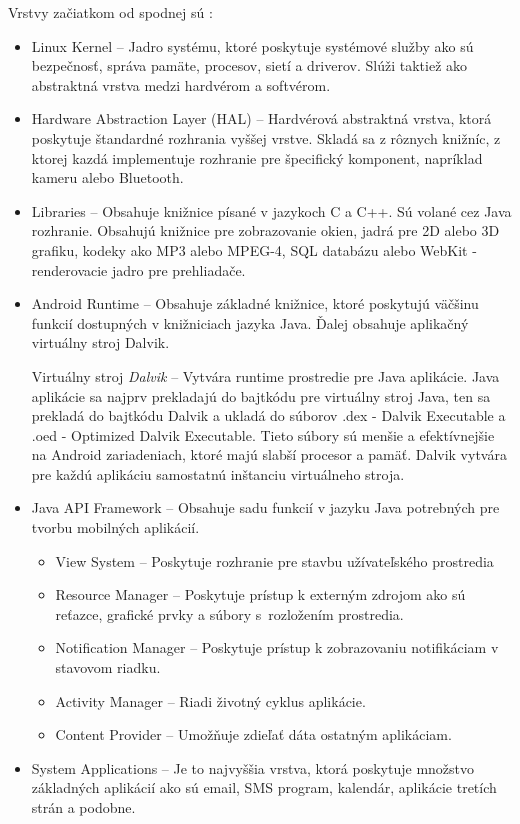 \documentclass{template/socthesis}
\begin{document}
Vrstvy začiatkom od spodnej sú \cite{gandhewar2010google}\cite{androiddevelopers}:
\begin{itemize}
	\item Linux Kernel -- Jadro systému, ktoré poskytuje systémové služby ako sú bezpečnosť, správa pamäte, procesov, sietí a driverov. Slúži taktiež ako abstraktná vrstva medzi hardvérom a softvérom.  
	\item Hardware Abstraction Layer (HAL) -- Hardvérová abstraktná vrstva, ktorá poskytuje štandardné rozhrania vyššej vrstve. Skladá sa z rôznych knižníc, z ktorej kazdá implementuje rozhranie pre špecifický komponent, napríklad kameru alebo Bluetooth.
	\item Libraries -- Obsahuje knižnice písané v jazykoch C a C++. Sú volané cez Java rozhranie. Obsahujú knižnice pre zobrazovanie okien, jadrá pre 2D alebo 3D grafiku, kodeky ako MP3 alebo MPEG-4, SQL databázu alebo WebKit - renderovacie jadro pre prehliadače. 
	\item Android Runtime -- Obsahuje základné knižnice, ktoré poskytujú väčšinu funkcií dostupných v knižniciach jazyka Java. Ďalej obsahuje aplikačný virtuálny stroj Dalvik. 
	
	Virtuálny stroj \textit{Dalvik} -- Vytvára runtime prostredie pre Java aplikácie. Java aplikácie sa najprv prekladajú do bajtkódu pre virtuálny stroj Java, ten sa prekladá do bajtkódu Dalvik a ukladá do súborov .dex - Dalvik Executable a .oed - Optimized Dalvik Executable. Tieto súbory sú menšie a efektívnejšie na Android zariadeniach, ktoré majú slabší procesor a pamäť. Dalvik vytvára pre každú aplikáciu samostatnú inštanciu virtuálneho stroja.  
	 
	\item Java API Framework -- Obsahuje sadu funkcií v jazyku Java potrebných pre tvorbu mobilných aplikácií.
		\begin{itemize} 
		\item View System -- Poskytuje rozhranie pre stavbu užívateľského prostredia
		\item Resource Manager -- Poskytuje prístup k externým zdrojom ako sú reťazce, grafické prvky a súbory s~rozložením prostredia. 
		\item Notification Manager -- Poskytuje prístup k zobrazovaniu notifikáciam v stavovom riadku.
		\item Activity Manager -- Riadi životný cyklus aplikácie.
		\item Content Provider -- Umožňuje zdieľať dáta ostatným aplikáciam.
		\end{itemize}
	\item System Applications -- Je to najvyššia vrstva, ktorá poskytuje množstvo základných aplikácií ako sú email, SMS program, kalendár, aplikácie tretích strán a podobne.
\end{itemize}
\end{document}
